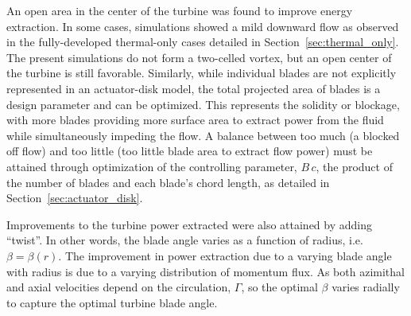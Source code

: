 An open area in the center of the turbine was found to improve energy
extraction. In some cases, simulations showed a mild downward flow as
observed in the fully-developed thermal-only cases detailed in
Section~\ref{sec:thermal_only}. The present simulations do not form a
two-celled vortex, but an open center of the turbine is still
favorable. Similarly, while individual blades are not explicitly
represented in an actuator-disk model, the total projected area of
blades is a design parameter and can be optimized. This represents the
solidity or blockage, with more blades providing more surface area to extract
power from the fluid while simultaneously impeding the flow. A balance
between too much (a blocked off flow) and too little (too little blade
area to extract flow power) must be attained through optimization of the
controlling parameter, $B \, c$, the product of the number of blades and
each blade's chord length, as detailed in
Section~\ref{sec:actuator_disk}. 

Improvements to the turbine power extracted were also attained by adding
``twist''. In other words, the blade angle varies as a function of
radius, i.e. $\beta = \beta(r)$. The improvement in power extraction due
to a varying blade angle with radius is due to a varying distribution
of momentum flux. As both azimithal and axial velocities depend on the
circulation, $\Gamma$, so the optimal $\beta$ varies radially to capture
the optimal turbine blade angle. 

